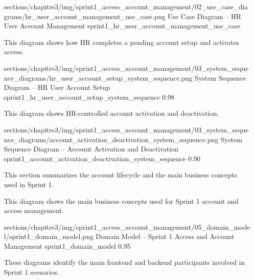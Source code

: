\ChapterThreeFigure
{sections/chapitre3/img/sprint1_access_account_management/02_use_case_diagrams/hr_user_account_management_use_case.png}
{Use Case Diagram – HR User Account Management}
{sprint1_hr_user_account_management_use_case}


\Needspace{10cm}

\noindent This diagram shows how HR completes a pending account setup and activates access.\par

\ChapterThreeFigureSized
{sections/chapitre3/img/sprint1_access_account_management/03_system_sequence_diagrams/hr_user_account_setup_system_sequence.png}
{System Sequence Diagram – HR User Account Setup}
{sprint1_hr_user_account_setup_system_sequence}
{0.98}

\Needspace{7.2cm}

\noindent This diagram shows HR-controlled account activation and deactivation.\par

\ChapterThreeFigureSized
{sections/chapitre3/img/sprint1_access_account_management/03_system_sequence_diagrams/account_activation_deactivation_system_sequence.png}
{System Sequence Diagram – Account Activation and Deactivation}
{sprint1_account_activation_deactivation_system_sequence}
{0.90}


{\fontsize{12}{18}\selectfont
\setlength{\parindent}{1.2cm}
\setlength{\parskip}{6pt}

\indent This section summarizes the account lifecycle and the main business concepts used in Sprint 1.
}

\Needspace{7.2cm}

\noindent This diagram shows the main business concepts used for Sprint 1 account and access management.\par

\ChapterThreeFigureSized
{sections/chapitre3/img/sprint1_access_account_management/05_domain_model/sprint1_domain_model.png}
{Domain Model – Sprint 1 Access and Account Management}
{sprint1_domain_model}
{0.95}


{\fontsize{12}{18}\selectfont
\setlength{\parindent}{1.2cm}
\setlength{\parskip}{6pt}

\indent These diagrams identify the main frontend and backend participants involved in Sprint 1 scenarios.
}

